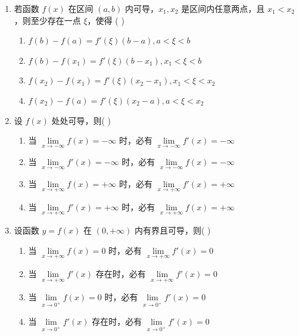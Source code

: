 \begin{enumerate}[label=\textbf{\arabic*.}, itemsep=6cm]
    \item 若函数 $f(x)$ 在区间 $(a,b)$ 内可导，$x_1, x_2$ 是区间内任意两点，且 $x_1 < x_2$，则至少存在一点 $\xi$，使得 ( )
    \begin{enumerate}
        \item $f(b) - f(a) = f'(\xi)(b-a), a < \xi < b$
        \item $f(b) - f(x_1) = f'(\xi)(b-x_1), x_1 < \xi < b$
        \item $f(x_2) - f(x_1) = f'(\xi)(x_2-x_1), x_1 < \xi < x_2$
        \item $f(x_2) - f(a) = f'(\xi)(x_2-a), a < \xi < x_2$
    \end{enumerate}
    
    \item 设 $f(x)$ 处处可导，则( )
    \begin{enumerate}
        \item 当 $\lim\limits_{x \to -\infty} f(x) = -\infty$ 时，必有 $\lim\limits_{x \to -\infty} f'(x) = -\infty$
        \item 当 $\lim\limits_{x \to -\infty} f'(x) = -\infty$ 时，必有 $\lim\limits_{x \to -\infty} f(x) = -\infty$
        \item 当 $\lim\limits_{x \to +\infty} f(x) = +\infty$ 时，必有 $\lim\limits_{x \to +\infty} f'(x) = +\infty$
        \item 当 $\lim\limits_{x \to +\infty} f'(x) = +\infty$ 时，必有 $\lim\limits_{x \to +\infty} f(x) = +\infty$
    \end{enumerate}
    
    \item 设函数 $y = f(x)$ 在 $(0,+\infty)$ 内有界且可导，则( )
    \begin{enumerate}
        \item 当 $\lim\limits_{x \to +\infty} f(x) = 0$ 时，必有 $\lim\limits_{x \to +\infty} f'(x) = 0$
        \item 当 $\lim\limits_{x \to +\infty} f'(x)$ 存在时，必有 $\lim\limits_{x \to +\infty} f'(x) = 0$
        \item 当 $\lim\limits_{x \to 0^+} f(x) = 0$ 时，必有 $\lim\limits_{x \to 0^+} f'(x) = 0$
        \item 当 $\lim\limits_{x \to 0^+} f'(x)$ 存在时，必有 $\lim\limits_{x \to 0^+} f'(x) = 0$
    \end{enumerate}
    
\end{enumerate}

